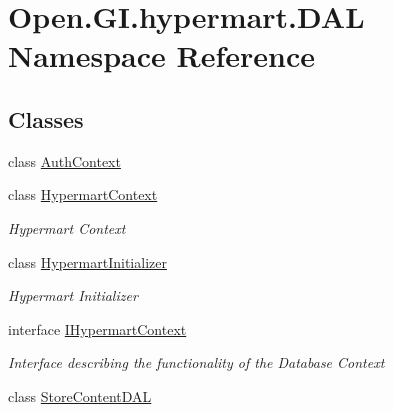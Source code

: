 \hypertarget{namespace_open_1_1_g_i_1_1hypermart_1_1_d_a_l}{}\section{Open.\+G\+I.\+hypermart.\+D\+AL Namespace Reference}
\label{namespace_open_1_1_g_i_1_1hypermart_1_1_d_a_l}
\subsection*{Classes}
\begin{DoxyCompactItemize}
\item 
class \hyperlink{class_open_1_1_g_i_1_1hypermart_1_1_d_a_l_1_1_auth_context}{Auth\+Context}
\item 
class \hyperlink{class_open_1_1_g_i_1_1hypermart_1_1_d_a_l_1_1_hypermart_context}{Hypermart\+Context}
\begin{DoxyCompactList}\small\item\em Hypermart Context \end{DoxyCompactList}\item 
class \hyperlink{class_open_1_1_g_i_1_1hypermart_1_1_d_a_l_1_1_hypermart_initializer}{Hypermart\+Initializer}
\begin{DoxyCompactList}\small\item\em Hypermart Initializer \end{DoxyCompactList}\item 
interface \hyperlink{interface_open_1_1_g_i_1_1hypermart_1_1_d_a_l_1_1_i_hypermart_context}{I\+Hypermart\+Context}
\begin{DoxyCompactList}\small\item\em Interface describing the functionality of the Database Context \end{DoxyCompactList}\item 
class \hyperlink{class_open_1_1_g_i_1_1hypermart_1_1_d_a_l_1_1_store_content_d_a_l}{Store\+Content\+D\+AL}
\end{DoxyCompactItemize}
